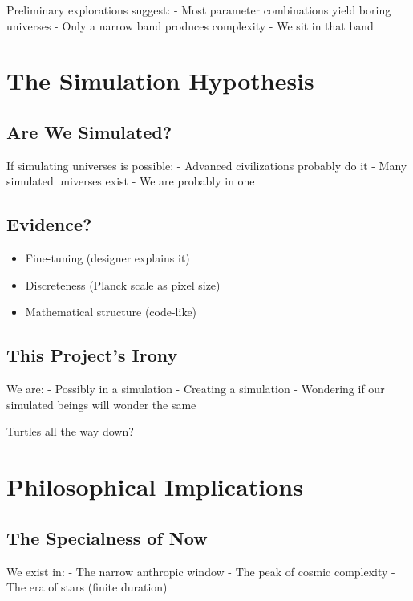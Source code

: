 \documentclass[
  11pt,
  letterpaper,
  twoside,
  openright]{book}
\providecommand{\tightlist}{%
  \setlength{\itemsep}{0pt}\setlength{\parskip}{0pt}}
\begin{document}
Preliminary explorations suggest: - Most parameter combinations yield
boring universes - Only a narrow band produces complexity - We sit in
that band

\section{The Simulation Hypothesis}\label{the-simulation-hypothesis}

\subsection{Are We Simulated?}\label{are-we-simulated}

If simulating universes is possible: - Advanced civilizations probably
do it - Many simulated universes exist - We are probably in one

\subsection{Evidence?}\label{evidence-2}

\begin{itemize}
\tightlist
\item
  Fine-tuning (designer explains it)
\item
  Discreteness (Planck scale as pixel size)
\item
  Mathematical structure (code-like)
\end{itemize}

\subsection{This Project's Irony}\label{this-projects-irony}

We are: - Possibly in a simulation - Creating a simulation - Wondering
if our simulated beings will wonder the same

Turtles all the way down?

\section{Philosophical Implications}\label{philosophical-implications}

\subsection{The Specialness of Now}\label{the-specialness-of-now}

We exist in: - The narrow anthropic window - The peak of cosmic
complexity - The era of stars (finite duration)
\end{document}
